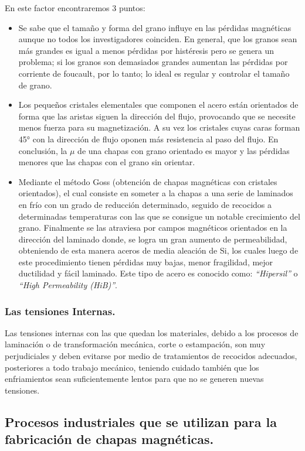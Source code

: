 \documentclass[12pt,a4paper]{article}
\begin{document}
En este factor encontraremos 3 puntos:
\begin{itemize}
    \item Se sabe que el tamaño y forma del grano influye en las pérdidas magnéticas aunque no todos los investigadores coinciden. En general, que los granos sean más grandes es igual a menos pérdidas por histéresis pero se genera un problema; si los granos son demasiados grandes aumentan las pérdidas por corriente de foucault, por lo tanto; lo ideal es regular y controlar el tamaño de grano.
    \item Los pequeños cristales elementales que componen el acero están orientados de forma que las aristas siguen la dirección del flujo, provocando que se necesite menos fuerza para su magnetización. A su vez los cristales cuyas caras forman 45° con la dirección de flujo oponen más resistencia al paso del flujo. En conclusión, la $\mu$ de una chapas con grano orientado es mayor y las pérdidas menores que las chapas con el grano sin orientar.
    \item Mediante el método Goss (obtención de chapas magnéticas con cristales orientados), el cual consiste en someter a la chapas a una serie de laminados en frío con un grado de reducción determinado, seguido de recocidos a determinadas temperaturas con las que se consigue un notable crecimiento del grano. Finalmente se las atraviesa por campos magnéticos orientados en la dirección del laminado donde, se logra un gran aumento de permeabilidad, obteniendo de esta manera aceros de media aleación de Si, los cuales luego de este procedimiento tienen pérdidas muy bajas, menor fragilidad, mejor ductilidad y fácil laminado. Este tipo de acero es conocido como: \textit{\enquote{Hipersil}} o \textit{\enquote{High Permeability (HiB)}}.
\end{itemize}

\subsubsection{Las tensiones Internas.}

Las tensiones internas con las que quedan los materiales, debido a los procesos de laminación o de transformación mecánica, corte o estampación, son muy perjudiciales y deben evitarse por medio de tratamientos de recocidos adecuados, posteriores a todo trabajo mecánico, teniendo cuidado también que los enfriamientos sean suficientemente lentos para que no se generen nuevas tensiones.

\subsection{Procesos industriales que se utilizan para la fabricación de chapas magnéticas.}
\end{document}
